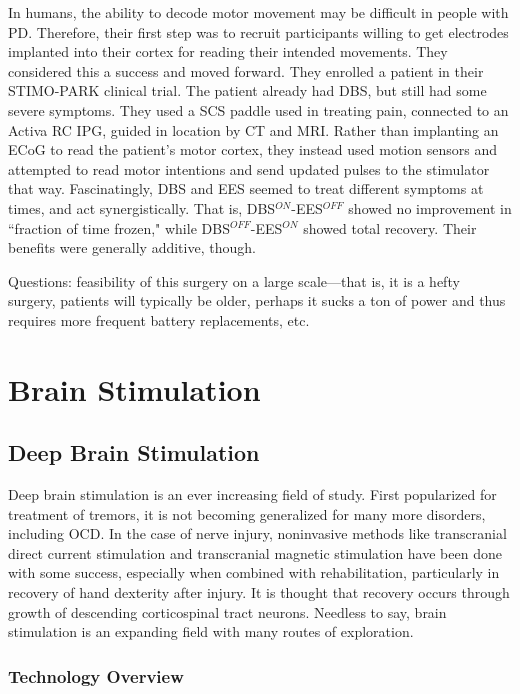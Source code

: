 In humans, the ability to decode motor movement may be difficult in people with PD. Therefore, their first step was to recruit participants willing to get electrodes implanted into their cortex for reading their intended movements. They considered this a success and moved forward. They enrolled a patient in their STIMO-PARK clinical trial. The patient already had DBS, but still had some severe symptoms. They used a SCS paddle used in treating pain, connected to an Activa RC IPG, guided in location by CT and MRI. Rather than implanting an ECoG to read the patient's motor cortex, they instead used motion sensors and attempted to read motor intentions and send updated pulses to the stimulator that way. Fascinatingly, DBS and EES seemed to treat different symptoms at times, and act synergistically. That is, DBS${}^{ON}$-EES${}^{OFF}$ showed no improvement in ``fraction of time frozen," while DBS${}^{OFF}$-EES${}^{ON}$ showed total recovery. Their benefits were generally additive, though.\newline


Questions: feasibility of this surgery on a large scale---that is, it is a hefty surgery, patients will typically be older, perhaps it sucks a ton of power and thus requires more frequent battery replacements, etc. 


\chapter{Brain Stimulation}

\section{Deep Brain Stimulation}

Deep brain stimulation is an ever increasing field of study. First popularized for treatment of tremors, it is not becoming generalized for many more disorders, including OCD. In the case of nerve injury, noninvasive methods like transcranial direct current stimulation and transcranial magnetic stimulation have been done with some success, especially when combined with rehabilitation, particularly in recovery of hand dexterity after injury. It is thought that recovery occurs through growth of descending corticospinal tract neurons. Needless to say, brain stimulation is an expanding field with many routes of exploration. 

\subsection{Technology Overview}

